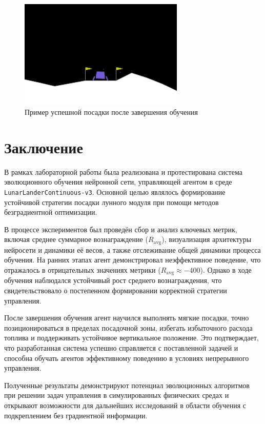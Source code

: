 \documentclass[a4paper,12pt]{article}
\begin{document}
\begin{figure}[H]
	\centering
	\includegraphics[width=0.7\textwidth]{images/successful_landing.png}
	\caption{Пример успешной посадки после завершения обучения}
	\label{fig:struct_screenshot}
\end{figure}


\newpage
\section*{Заключение}

В рамках лабораторной работы была реализована и протестирована система эволюционного обучения нейронной сети, управляющей агентом в среде \texttt{LunarLanderContinuous-v3}. Основной целью являлось формирование устойчивой стратегии посадки лунного модуля при помощи методов безградиентной оптимизации.

В процессе экспериментов был проведён сбор и анализ ключевых метрик, включая среднее суммарное вознаграждение ($R_{\text{avg}}$), визуализация архитектуры нейросети и динамики её весов, а также отслеживание общей динамики процесса обучения. На ранних этапах агент демонстрировал неэффективное поведение, что отражалось в отрицательных значениях метрики ($R_{\text{avg}} \approx -400$). Однако в ходе обучения наблюдался устойчивый рост среднего вознаграждения, что свидетельствовало о постепенном формировании корректной стратегии управления.

После завершения обучения агент научился выполнять мягкие посадки, точно позиционироваться в пределах посадочной зоны, избегать избыточного расхода топлива и поддерживать устойчивое вертикальное положение. Это подтверждает, что разработанная система успешно справляется с поставленной задачей и способна обучать агентов эффективному поведению в условиях непрерывного управления.

Полученные результаты демонстрируют потенциал эволюционных алгоритмов при решении задач управления в симулированных физических средах и открывают возможности для дальнейших исследований в области обучения с подкреплением без градиентной информации.
\end{document}
